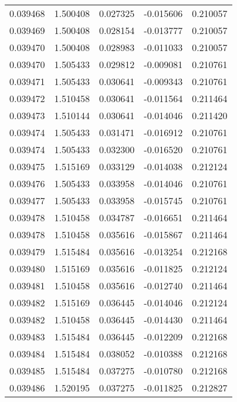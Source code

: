 \begin{tabular}{lrrrr}
0.039468    &  1.500408 &  0.027325 & -0.015606 &             0.210057 \\
0.039469    &  1.500408 &  0.028154 & -0.013777 &             0.210057 \\
0.039470    &  1.500408 &  0.028983 & -0.011033 &             0.210057 \\
0.039470    &  1.505433 &  0.029812 & -0.009081 &             0.210761 \\
0.039471    &  1.505433 &  0.030641 & -0.009343 &             0.210761 \\
0.039472    &  1.510458 &  0.030641 & -0.011564 &             0.211464 \\
0.039473    &  1.510144 &  0.030641 & -0.014046 &             0.211420 \\
0.039474    &  1.505433 &  0.031471 & -0.016912 &             0.210761 \\
0.039474    &  1.505433 &  0.032300 & -0.016520 &             0.210761 \\
0.039475    &  1.515169 &  0.033129 & -0.014038 &             0.212124 \\
0.039476    &  1.505433 &  0.033958 & -0.014046 &             0.210761 \\
0.039477    &  1.505433 &  0.033958 & -0.015745 &             0.210761 \\
0.039478    &  1.510458 &  0.034787 & -0.016651 &             0.211464 \\
0.039478    &  1.510458 &  0.035616 & -0.015867 &             0.211464 \\
0.039479    &  1.515484 &  0.035616 & -0.013254 &             0.212168 \\
0.039480    &  1.515169 &  0.035616 & -0.011825 &             0.212124 \\
0.039481    &  1.510458 &  0.035616 & -0.012740 &             0.211464 \\
0.039482    &  1.515169 &  0.036445 & -0.014046 &             0.212124 \\
0.039482    &  1.510458 &  0.036445 & -0.014430 &             0.211464 \\
0.039483    &  1.515484 &  0.036445 & -0.012209 &             0.212168 \\
0.039484    &  1.515484 &  0.038052 & -0.010388 &             0.212168 \\
0.039485    &  1.515484 &  0.037275 & -0.010780 &             0.212168 \\
0.039486    &  1.520195 &  0.037275 & -0.011825 &             0.212827 \\

\end{tabular}

